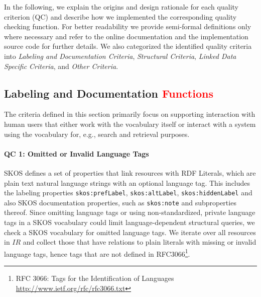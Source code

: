 

In the following, we explain the origins and design rationale for each quality criterion (QC) and describe how we implemented the corresponding quality checking function. For better readability we provide semi-formal definitions only where necessary and refer to the online documentation and the implementation source code for further details. We also categorized the identified quality criteria into \emph{Labeling and Documentation Criteria}, \emph{Structural Criteria}, \emph{Linked Data Specific Criteria}, and \emph{Other Criteria}. 



\subsection{Labeling and Documentation \textcolor{red}{Functions}}

The criteria defined in this section primarily focus on supporting interaction with human users that either work with the vocabulary itself or interact with a system using the vocabulary for, e.g., search and retrieval purposes.

\paragraph{QC 1: Omitted or Invalid Language Tags}

SKOS defines a set of properties that link resources with RDF Literals, which are plain text natural language strings with an optional language tag. This includes the labeling properties \texttt{skos:prefLabel}, \texttt{skos:altLabel}, \texttt{skos:hiddenLabel} and also SKOS documentation properties, such as \texttt{skos:note} and subproperties thereof. Since omitting language tags or using non-standardized, private language tags in a SKOS vocabulary could limit language-dependent structural queries, we check a SKOS vocabulary for omitted language tags. We iterate over all resources in $IR$ and collect those that have relations to plain literals with missing or invalid language tags, hence tags that are not defined in RFC3066\footnote{RFC 3066: Tags for the Identification of Languages \url{http://www.ietf.org/rfc/rfc3066.txt}}.

